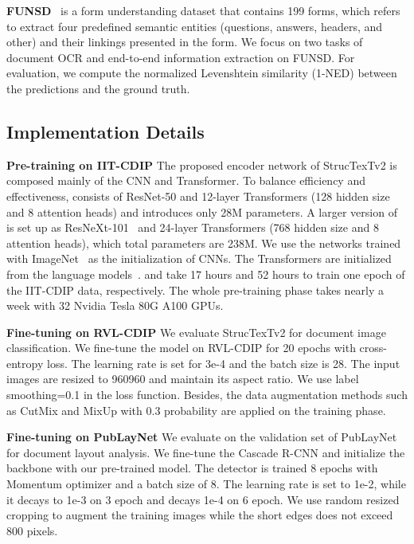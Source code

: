 \documentclass{article} \usepackage{iclr2023_conference,times}
\begin{document}
\noindent\textbf{FUNSD}~\cite{jaume2019funsd} is a form understanding dataset that contains 199 forms, which refers to extract four predefined semantic entities (questions, answers, headers, and other) and their linkings presented in the form. We focus on two tasks of document OCR and end-to-end information extraction on FUNSD. For evaluation, we compute the normalized Levenshtein similarity (1-NED) between the predictions and the ground truth.


\subsection{Implementation Details}
\noindent\textbf{Pre-training on IIT-CDIP} The proposed encoder network of StrucTexTv2 is composed mainly of the CNN and Transformer. To balance efficiency and effectiveness,  consists of ResNet-50 and 12-layer Transformers (128 hidden size and 8 attention heads) and introduces only 28M parameters. A larger version of  is set up as ResNeXt-101~\cite{xie2017aggregated} and 24-layer Transformers (768 hidden size and 8 attention heads), which total parameters are 238M. We use the networks trained with ImageNet~\cite{deng2009imagenet} as the initialization of CNNs. The Transformers are initialized from the language models~\cite{SunWLFTWW20}. 
 and  take 17 hours and 52 hours to train one epoch of the IIT-CDIP data, respectively. The whole pre-training phase takes nearly a week with 32 Nvidia Tesla 80G A100 GPUs.

\noindent\textbf{Fine-tuning on RVL-CDIP} We evaluate StrucTexTv2 for document image classification. We fine-tune the model on RVL-CDIP for 20 epochs with cross-entropy loss. The learning rate is set for 3e-4 and the batch size is 28. The input images are resized to 960960 and maintain its aspect ratio. We use label smoothing=0.1 in the loss function. Besides, the data augmentation methods such as CutMix and MixUp with 0.3 probability are applied on the training phase.

\noindent\textbf{Fine-tuning on PubLayNet} We evaluate on the validation set of PubLayNet for document layout analysis. We fine-tune the Cascade R-CNN and initialize the backbone with our pre-trained model. The detector is trained 8 epochs with Momentum optimizer and a batch size of 8. The learning rate is set to 1e-2, while it decays to 1e-3 on 3 epoch and decays 1e-4 on 6 epoch. We use random resized cropping to augment the training images while the short edges does not exceed 800 pixels.
\end{document}
